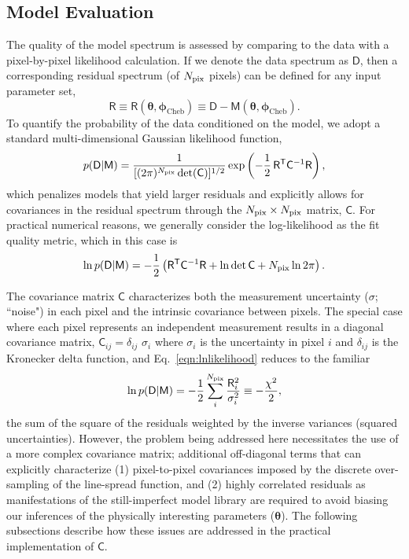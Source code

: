 \documentclass[iop,floatfix]{emulateapj}
\newcommand{\vt}{ {\bm \theta}}
\newcommand{\vM}{\mathsf{M}}
\newcommand{\vD}{\mathsf{D}}
\newcommand{\vR}{\mathsf{R}}
\newcommand{\vC}{\mathsf{C}}
\newcommand{\trans}{\mathsf{T}}
\newcommand{\vt}{ {\bm \theta}}
\newcommand{\vp}{ {\bm \phi}}
\newcommand{\stellarParameters}{\vt}
\newcommand{\cheb}{ \vp_{\textrm{Cheb}}}
\begin{document}
\subsection{Model Evaluation} \label{subsec:likelihood}

The quality of the model spectrum is assessed by comparing to the data with a pixel-by-pixel 
likelihood calculation.  If we denote the data spectrum as $\vD$, then a corresponding residual 
spectrum (of $N_{\rm pix}$ pixels) can be defined for any input parameter set,
\begin{equation}
\vR \equiv \vR(\stellarParameters, \cheb) \equiv \vD-\vM(\stellarParameters, \cheb).
\end{equation}
To quantify the probability of the data conditioned on the model, we adopt a standard 
multi-dimensional Gaussian likelihood function,
\begin{equation}
p(\vD|\vM) =  \frac{1}{[(2 \pi)^{N_{\rm pix}} \det(\vC)]^{1/2}} \exp\left ( -\frac{1}{2} \,
   \vR^\trans \vC^{-1} \vR \right ), 
   \label{eqn:likelihood}
\end{equation}
which penalizes models that yield larger residuals and explicitly allows for covariances in the 
residual spectrum through the $N_{\rm pix} \times N_{\rm pix}$ matrix, $\vC$.  For practical 
numerical reasons, we generally consider the log-likelihood as the fit quality metric, which in 
this case is
\begin{equation}
  \ln{p(\vD | \vM)} = -\frac{1}{2} \left( \vR^\trans \vC^{-1} \vR + \ln{\det{\vC}} + N_{\rm pix} \ln{2\pi} \right).
  \label{eqn:lnlikelihood}
\end{equation}

The covariance matrix $\vC$ characterizes both the measurement uncertainty ($\sigma$; ``noise") in 
each pixel and the intrinsic covariance between pixels.  The special case where each pixel 
represents an independent measurement results in a diagonal covariance matrix, $\vC_{ij} = 
\delta_{ij} \,\, \sigma_i$ where $\sigma_i$ is the uncertainty in pixel $i$ and $\delta_{ij}$ is 
the Kronecker delta function, and Eq.~\ref{eqn:lnlikelihood} reduces to the familiar
\begin{equation}
\ln{p(\vD | \vM)} = -\frac{1}{2} \sum_i^{N_{\rm pix}} \frac{\vR_i^2}{\sigma_i^2} \equiv -\frac{\chi^2}{2},
\label{eqn:chisq}
\end{equation}
the sum of the square of the residuals weighted by the inverse variances (squared uncertainties).  
However, the problem being addressed here necessitates the use of a more complex covariance matrix; 
additional off-diagonal terms that can explicitly characterize (1) pixel-to-pixel covariances 
imposed by the discrete over-sampling of the line-spread function, and (2) highly correlated 
residuals as manifestations of the still-imperfect model library are required to avoid biasing our 
inferences of the physically interesting parameters ($\vt$).  The following subsections describe 
how these issues are addressed in the practical implementation of $\vC$.  
\end{document}
